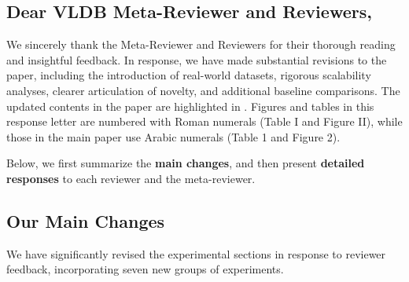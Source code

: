 \subsection*{Dear VLDB Meta-Reviewer and Reviewers,}

\noindent
We sincerely thank the Meta-Reviewer and Reviewers for their thorough reading and insightful feedback.
In response, we have made substantial revisions to the paper, including the introduction of real-world datasets, rigorous scalability analyses, clearer articulation of novelty, and additional baseline comparisons.
The updated contents in the paper are highlighted in .
Figures and tables in this response letter are numbered with Roman numerals (\eg Table I and Figure II), while those in the main paper use Arabic numerals (\eg Table 1 and Figure 2).

Below, we first summarize the \textbf{main changes}, and then present \textbf{detailed responses} to each reviewer and the meta-reviewer.

\subsection*{Our Main Changes}

We have significantly revised the experimental sections in response to reviewer feedback, incorporating seven new groups of experiments.

